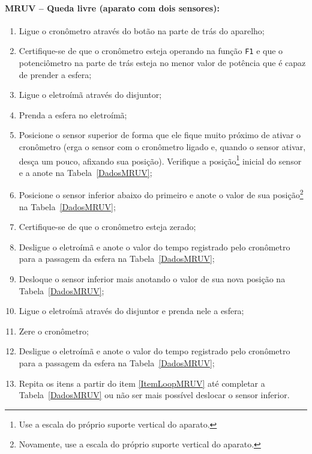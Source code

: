 \paragraph{MRUV -- Queda livre (aparato com dois sensores):}

\begin{enumerate}
    \item Ligue o cronômetro através do botão na parte de trás do aparelho;
    \item Certifique-se de que o cronômetro esteja operando na função \texttt{F1} e que o potenciômetro na parte de trás esteja no menor valor de potência que é capaz de prender a esfera;
    \item Ligue o eletroímã através do disjuntor;
	\item Prenda a esfera no eletroímã;
	\item Posicione o sensor superior de forma que ele fique muito próximo de ativar o cronômetro (erga o sensor com o cronômetro ligado e, quando o sensor ativar, desça um pouco, afixando sua posição). Verifique a posição\footnote{Use a escala do próprio suporte vertical do aparato.} inicial do sensor e a anote na Tabela~\ref{DadosMRUV};
	\item Posicione o sensor inferior  abaixo do primeiro e anote o valor de sua posição\footnote{Novamente, use a escala do próprio suporte vertical do aparato.} na Tabela~\ref{DadosMRUV};
	\item Certifique-se de que o cronômetro esteja zerado;
	\item Desligue o eletroímã e anote o valor do tempo registrado pelo cronômetro para a passagem da esfera na Tabela~\ref{DadosMRUV};
	\item Desloque o sensor inferior mais  anotando o valor de sua nova posição na Tabela~\ref{DadosMRUV};\label{ItemLoopMRUV}
	\item Ligue o eletroímã através do disjuntor e prenda nele a esfera;
	\item Zere o cronômetro;
	\item Desligue o eletroímã e anote o valor do tempo registrado pelo cronômetro para a passagem da esfera na Tabela~\ref{DadosMRUV};
	\item Repita os itens a partir do item \ref{ItemLoopMRUV} até completar a Tabela~\ref{DadosMRUV} ou não ser mais possível deslocar o sensor inferior.
\end{enumerate}

